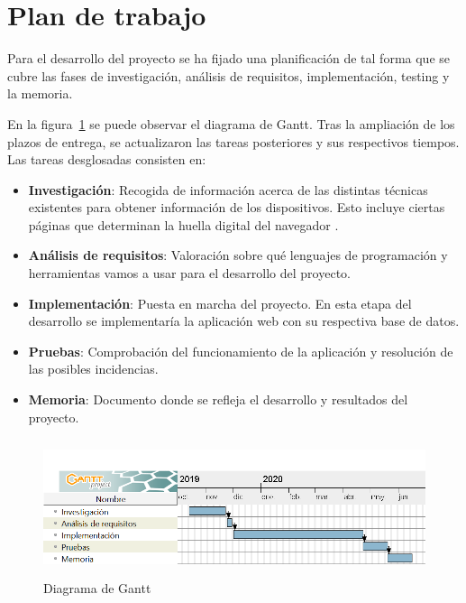 \section{Plan de trabajo}
Para el desarrollo del proyecto se ha fijado una planificación de tal forma que se cubre las fases de investigación, análisis de requisitos, implementación, testing y la memoria.\par
En la figura~\ref{fig:diagramaGantt} se puede observar el diagrama de Gantt. Tras la ampliación de los plazos de entrega, se actualizaron las tareas posteriores y sus respectivos tiempos. Las tareas desglosadas consisten en:
\begin{itemize}
	\item \textbf{Investigación}: Recogida de información acerca de las distintas técnicas existentes para obtener información de los dispositivos. Esto incluye ciertas páginas que determinan la huella digital del navegador \cite{amiunique}.
	\item \textbf{Análisis de requisitos}: Valoración sobre qué lenguajes de programación y herramientas vamos a usar para el desarrollo del proyecto.
	\item \textbf{Implementación}: Puesta en marcha del proyecto. En esta etapa del desarrollo se implementaría la aplicación web con su respectiva base de datos.
	\item \textbf{Pruebas}: Comprobación del funcionamiento de la aplicación y resolución de las posibles incidencias.
	\item \textbf{Memoria}: Documento donde se refleja el desarrollo y resultados del proyecto.
\end{itemize}
\begin{figure}[b]
	\includegraphics[width=1\textwidth, height=4cm]{Images/diagramaGantt.png}
	\caption{Diagrama de Gantt}
	\label{fig:diagramaGantt}
\end{figure}

